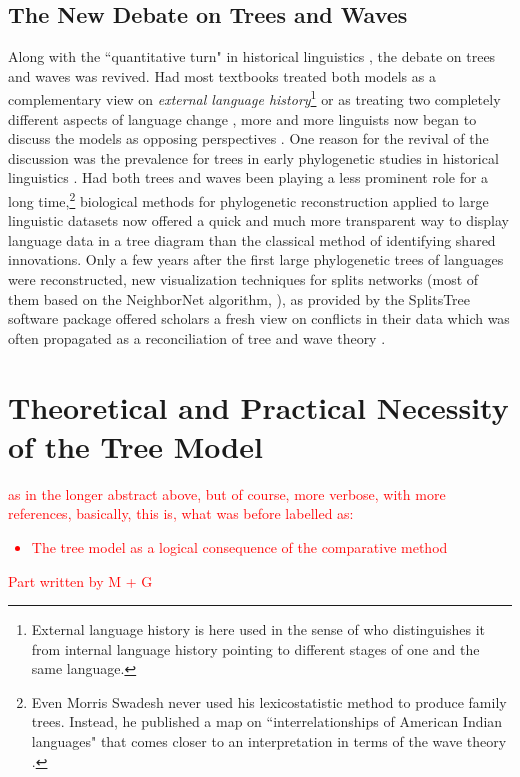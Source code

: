 \documentclass[svgnames,12pt]{scrartcl}
\newcommand\Comment[1]{\textcolor{red}{#1}}
\begin{document}
{\subsection{The New Debate on Trees and Waves}
Along with the ``quantitative turn" in historical linguistics \citep[209f]{List2014d}, the debate on
trees and waves was revived. Had most textbooks treated both models as a complementary view on
\emph{external language history}\footnote{External language history is here used in the sense of
\citet{Gabelentz1891} who distinguishes it from internal language history pointing to different
stages of one and the same language.} \citep{Lehmann1992,Anttila1972} or as treating two completely
different aspects of language change \citep{Campbell1999}, more and more linguists now began to 
discuss the models as opposing perspectives \citep{Francois2015}. One reason for the revival of the
discussion was the prevalence for trees in early phylogenetic studies in historical linguistics
\citep{Gray2003,Atkinson2006,Ringe2002,Pagel2009}. Had both trees and waves been playing a less
prominent role for a long time,\footnote{Even Morris Swadesh never used his lexicostatistic method to
produce family trees. Instead, he published a map on ``interrelationships of American Indian
languages" that comes closer to an interpretation in terms of the wave theory
\citep[23]{Swadesh1959}.} biological methods for phylogenetic reconstruction applied to large
linguistic datasets now offered a quick and much more transparent way to display language data in a
tree diagram than the classical method of identifying shared innovations.
Only a few years after the first large phylogenetic trees of languages were reconstructed, new
visualization techniques for splits networks (most of them based on the NeighborNet algorithm,
\citealt{Bryant2004}), as provided by the SplitsTree software package \citep{Huson1998} offered
scholars a fresh view on conflicts in their data which was often propagated as a reconciliation of
tree and wave theory \citep{Hamed2006,Heggarty2010,McMahon2005}.


\section{Theoretical and Practical Necessity of the Tree Model}
\Comment{as in the longer abstract above, but of course, more verbose, with more references,
basically, this is, what was before labelled as:
\begin{itemize}
    \item The tree model as a logical consequence of the comparative method
\end{itemize}
Part written by M + G}
}
\end{document}
